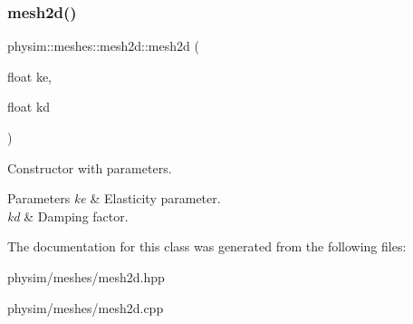 \subsubsection{\texorpdfstring{mesh2d()}{mesh2d()}}
{\footnotesize\ttfamily physim\+::meshes\+::mesh2d\+::mesh2d (\begin{DoxyParamCaption}\item[{float}]{ke,  }\item[{float}]{kd }\end{DoxyParamCaption})}



Constructor with parameters. 


\begin{DoxyParams}{Parameters}
{\em ke} & Elasticity parameter. \\
\hline
{\em kd} & Damping factor. \\
\hline
\end{DoxyParams}


The documentation for this class was generated from the following files\+:\begin{DoxyCompactItemize}
\item 
physim/meshes/mesh2d.\+hpp\item 
physim/meshes/mesh2d.\+cpp\end{DoxyCompactItemize}
